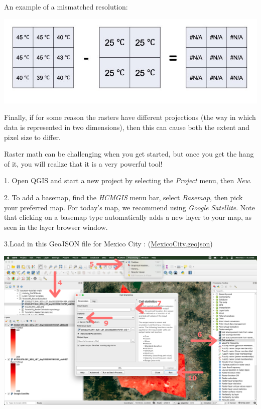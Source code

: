 \documentclass[oneside,a4paper,11pt,explicit]{book}
\begin{document}
\begin{tcolorbox}[enhanced jigsaw,breakable,pad at break*=1mm,
  colback=yellow!5!white,colframe=IceCreamLeaf,title=An Introduction to Raster Math]
   An example of a mismatched resolution:
   
    \vspace{.5em}

    \centerline{\includegraphics[width=\textwidth]{resolution.png}}

    \vspace{.5em}
 
    Finally, if for some reason the rasters have different projections (the way in which data is represented in two dimensions), then this can cause both the extent and pixel size to differ. 

     \vspace{.25em}
 
    Raster math can be challenging when you get started, but once you get the hang of it, you will realize that it is a very powerful tool! 

\end{tcolorbox}

\vspace{.5em}

1. Open QGIS and start a new project by selecting the \textit{Project} menu, then \textit{New}.

2. To add a basemap, find the \textit{HCMGIS} menu bar, select \textit{Basemap}, then pick your preferred map. For today's map, we recommend using \textit{Google Satellite}. Note that clicking on a basemap type automatically adds a new layer to your map, as seen in the layer browser window.

3.Load in this GeoJSON file for Mexico City : (\href{https://jeremydforsythe.github.io/icecream-tutorials/Tutorial11_ESI/MexicoCityPolygon/MexicoCity.geojson}{\small MexicoCity.geojson})

\vspace{.5em}

\centerline{\includegraphics[width=\textwidth]{CellStatistics.png}}
\end{document}
